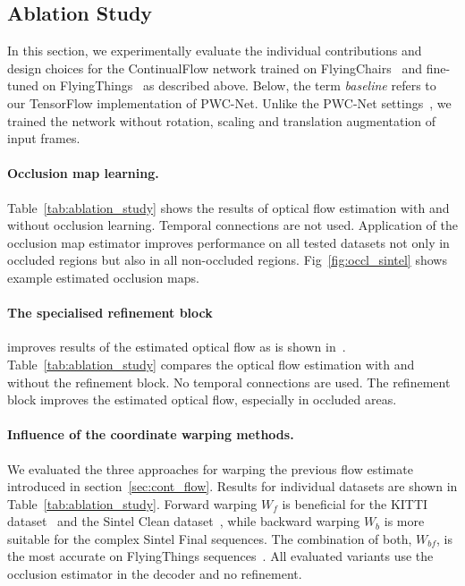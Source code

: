\documentclass[runningheads]{llncs}
\begin{document}
\subsection{Ablation Study}
In this section, we experimentally evaluate the individual contributions and design choices for the ContinualFlow network trained on FlyingChairs~\cite{Dosovitskiy2015} and fine-tuned on FlyingThings~\cite{Mayer2016} as described above. 
Below, the term {\it baseline} refers to our TensorFlow implementation of PWC-Net.
Unlike the PWC-Net settings~\cite{Sun2017}, we trained  the network without rotation, scaling and translation augmentation of input frames.





\paragraph{\bf\textbf{Occlusion map learning.}} 
Table~\ref{tab:ablation_study} shows the results of optical flow estimation with and without occlusion learning.
Temporal connections are not used. Application of the occlusion map estimator improves performance on all tested datasets not only in occluded regions but also in all non-occluded regions.
Fig~\ref{fig:occl_sintel} shows example estimated occlusion maps.

\paragraph{\bf\textbf{The specialised refinement block}} improves results of  the estimated optical flow as is shown in~\cite{Ilg2016}.
Table~\ref{tab:ablation_study} compares the optical flow estimation with and without the refinement block. No temporal connections are used.
The refinement block improves the estimated optical flow, especially in occluded areas.


\paragraph{\bf\textbf{Influence of the coordinate warping methods.}}
We evaluated the three approaches for warping the previous flow estimate  introduced in section~\ref{sec:cont_flow}. Results for individual datasets are shown in Table~\ref{tab:ablation_study}. 
Forward warping $W_f$ is beneficial for the KITTI dataset~\cite{Menze2015} and the Sintel Clean dataset~\cite{Butler2012}, while backward warping $W_b$ is more suitable for the complex Sintel Final sequences.
The combination of both, $W_{bf}$,  is the most accurate on FlyingThings sequences~\cite{Mayer2016}.
All evaluated variants use the occlusion estimator in the decoder and no refinement. 
\end{document}

